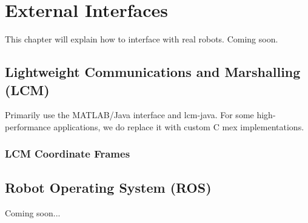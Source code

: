 \chapter{External Interfaces}

This chapter will explain how to interface with real robots.  Coming soon.

\section{Lightweight Communications and Marshalling (LCM)}

Primarily use the MATLAB/Java interface and lcm-java.  For some high-performance applications, we do replace it with custom C mex implementations.

\subsection{LCM Coordinate Frames}



\section{Robot Operating System (ROS)}

Coming soon...